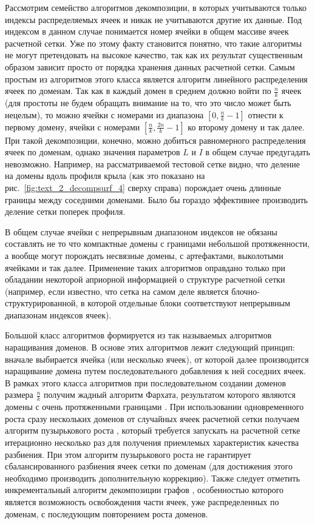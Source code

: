 Рассмотрим семейство алгоритмов декомпозиции, в которых учитываются только индексы распределяемых ячеек и никак не учитываются другие их данные.
Под индексом в данном случае понимается номер ячейки в общем массиве ячеек расчетной сетки.
Уже по этому факту становится понятно, что такие алгоритмы не могут претендовать на высокое качество, так как их результат существенным образом зависит просто от порядка хранения данных расчетной сетки.
Самым простым из алгоритмов этого класса является алгоритм линейного распределения ячеек\label{term:alg_decomp_linear} по доменам.
Так как в каждый домен в среднем должно войти по $\frac{n}{k}$ ячеек (для простоты не будем обращать внимание на то, что это число может быть нецелым), то можно ячейки с номерами из диапазона $[0, \frac{n}{k} - 1]$ отнести к первому домену, ячейки с номерами $[\frac{n}{k}, \frac{2n}{k} - 1]$ ко второму домену и так далее.
При такой декомпозиции, конечно, можно добиться равномерного распределения ячеек по доменам, однако значения параметров $L$\label{term:decomp_maxbord2} и $I$\label{term:decomp_sumbord2} в общем случае предугадать невозможно.
Например, на рассматриваемой тестовой сетке видно, что деление на домены вдоль профиля крыла (как это показано на рис.~\ref{fig:text_2_decompsurf_4} сверху справа) порождает очень длинные границы между соседними доменами.
Было бы гораздо эффективнее производить деление сетки поперек профиля.

В общем случае ячейки с непрерывным диапазоном индексов не обязаны составлять не то что компактные домены с границами небольшой протяженности, а вообще могут порождать несвязные домены, с артефактами, выколотыми ячейками и так далее.
Применение таких алгоритмов оправдано только при обладании некоторой априорной информацией о структуре расчетной сетки (например, если известно, что сетка на самом деле является блочно-структурированной, в которой отдельные блоки соответствуют непрерывным диапазонам индексов ячеек).

Большой класс алгоритмов формируется из так называемых алгоритмов наращивания доменов\label{term:alg_decomp_rgrow}.
В основе этих алгоритмов лежит следующий принцип: вначале выбирается ячейка (или несколько ячеек), от которой далее производится наращивание домена путем последовательного добавления к ней соседних ячеек.
В рамках этого класса алгоритмов при последовательном создании доменов размера $\frac{n}{k}$ получим жадный алгоритм Фархата\label{term:alg_decomp_farhat}, результатом которого являются домены с очень протяженными границами \cite{Farhat1988Decomp}.
При использовании одновременного роста сразу нескольких доменов от случайных ячеек расчетной сетки получаем алгоритм пузырькового роста \cite{Preis1997Decomp}\label{term:alg_decomp_bubble}, который требуется запускать на расчетной сетке итерационно несколько раз для получения приемлемых характеристик качества разбиения.
При этом алгоритм пузырькового роста не гарантирует сбалансированного разбиения ячеек сетки по доменам (для достижения этого необходимо производить дополнительную коррекцию).
Также следует отметить инкрементальный алгоритм декомпозиции графов \cite{Yakobovsky2005Decomp}\label{term:alg_decomp_inc2}, особенностью которого является возможность освобождения части ячеек, уже распределенных по доменам, с последующим повторением роста доменов.


